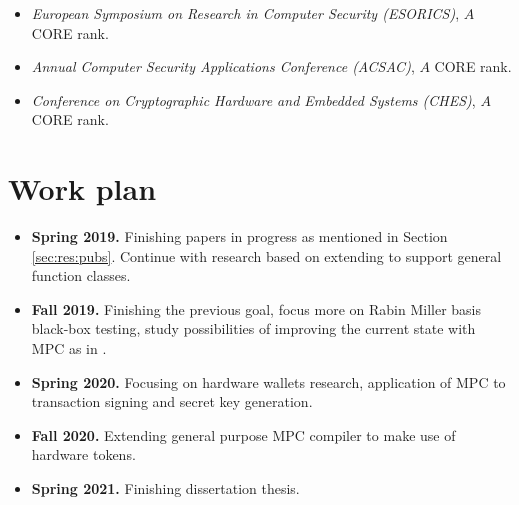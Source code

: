 \documentclass[
  digital, %
  twoside, %
  table,   %
  lof,     %
  lot,     %
]{fithesis3}
\newcommand{\itembf}[1]{\item {\bf{#1}}}
\newcounter{ph4_show_guides}
\theoremstyle{definition}
\theoremstyle{remark}
\begin{document}
\begin{itemize}
	\item \emph{European Symposium on Research in Computer Security (ESORICS)}, $A$ CORE rank.
	
	\item \emph{Annual Computer Security Applications Conference (ACSAC)}, $A$ CORE rank.
	
	\item \emph{Conference on Cryptographic Hardware and Embedded Systems (CHES)}, $A$ CORE rank.
	
	
	
	
\end{itemize}


\section{Work plan}
\begin{itemize}
	\itembf{Spring 2019.} Finishing papers in progress as mentioned in Section \ref{sec:res:pubs}. Continue with research based on extending \cite{2017-ccs-mavroudis} to support general function classes.
	
	\itembf{Fall 2019.} Finishing the previous goal, focus more on Rabin Miller basis black-box testing, study possibilities of improving the current state with MPC as in \cite{DCMBR18}.
	
	\itembf{Spring 2020.} Focusing on hardware wallets research, application of MPC to transaction signing and secret key generation.
	
	\itembf{Fall 2020.} Extending general purpose MPC compiler to make use of hardware tokens.
	
	\itembf{Spring 2021.} Finishing dissertation thesis.
\end{itemize}
\end{document}

